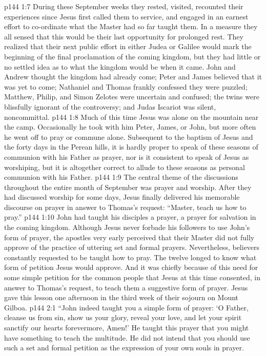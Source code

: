 \vs p144 1:7 During these September weeks they rested, visited, recounted their experiences since Jesus first called them to service, and engaged in an earnest effort to co\hyp{}ordinate what the Master had so far taught them. In a measure they all sensed that this would be their last opportunity for prolonged rest. They realized that their next public effort in either Judea or Galilee would mark the beginning of the final proclamation of the coming kingdom, but they had little or no settled idea as to what the kingdom would be when it came. John and Andrew thought the kingdom had already come; Peter and James believed that it was yet to come; Nathaniel and Thomas frankly confessed they were puzzled; Matthew, Philip, and Simon Zelotes were uncertain and confused; the twins were blissfully ignorant of the controversy; and Judas Iscariot was silent, noncommittal.
\vs p144 1:8 \pc Much of this time Jesus was alone on the mountain near the camp. Occasionally he took with him Peter, James, or John, but more often he went off to pray or commune alone. Subsequent to the baptism of Jesus and the forty days in the Perean hills, it is hardly proper to speak of these seasons of communion with his Father as prayer, nor is it consistent to speak of Jesus as worshiping, but it is altogether correct to allude to these seasons as personal communion with his Father.
\vs p144 1:9 The central theme of the discussions throughout the entire month of September was prayer and worship. After they had discussed worship for some days, Jesus finally delivered his memorable discourse on prayer in answer to Thomas’s request: “Master, teach us how to pray.”
\vs p144 1:10 John had taught his disciples a prayer, a prayer for salvation in the coming kingdom. Although Jesus never forbade his followers to use John’s form of prayer, the apostles very early perceived that their Master did not fully approve of the practice of uttering set and formal prayers. Nevertheless, believers constantly requested to be taught how to pray. The twelve longed to know what form of petition Jesus would approve. And it was chiefly because of this need for some simple petition for the common people that Jesus at this time consented, in answer to Thomas’s request, to teach them a suggestive form of prayer. Jesus gave this lesson one afternoon in the third week of their sojourn on Mount Gilboa.
\vs p144 2:1 \textcolor{ubdarkred}{“John indeed taught you a simple form of prayer: ‘O Father, cleanse us from sin, show us your glory, reveal your love, and let your spirit sanctify our hearts forevermore, Amen!’ He taught this prayer that you might have something to teach the multitude. He did not intend that you should use such a set and formal petition as the expression of your own souls in prayer.}
